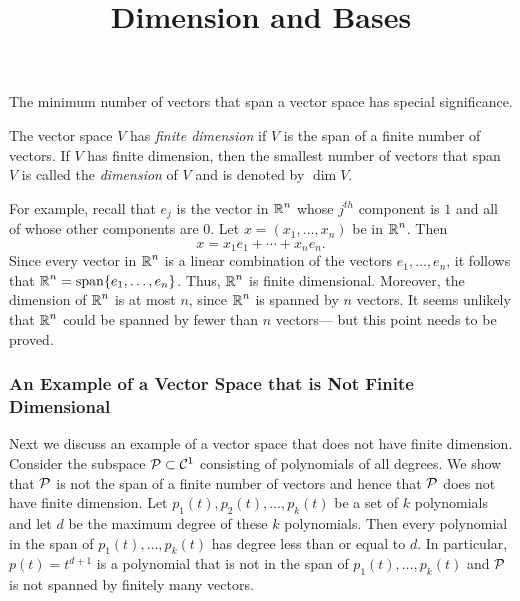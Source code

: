\documentclass{ximera}
\title{Dimension and Bases}
\begin{document}
\begin{abstract}
\end{abstract}
\maketitle

 \label{S:5.5}

The minimum number of vectors that span a vector space has special
significance.

\begin{definition}
The vector space $V$ has {\em finite dimension\/} if $V$ is the
span of a finite number of vectors.  If $V$ has finite dimension, then the
smallest number of vectors that span $V$ is called the {\em dimension\/} of
$V$ and is denoted by $\dim V$.
\end{definition}  

For example, recall that $e_j$ is the vector in $\mbox{$\Bbb{R}$}^n$ whose $j^{th}$
component is $1$ and all of whose other components are $0$.
Let $x=(x_1,\ldots,x_n)$ be in $\mbox{$\Bbb{R}$}^n$. Then
\begin{equation}  \label{e:spanrn}
x =  x_1e_1 + \cdots + x_ne_n.
\end{equation}
Since every vector in $\mbox{$\Bbb{R}$}^n$ is a linear combination of the
vectors $e_1,\ldots,e_n$, it follows that
$\mbox{$\Bbb{R}$}^n={\rm span}\{e_1,\ldots,e_n\}$.  Thus, $\mbox{$\Bbb{R}$}^n$ is finite
dimensional.  Moreover, the dimension of $\mbox{$\Bbb{R}$}^n$ is at most $n$,
since $\mbox{$\Bbb{R}$}^n$ is spanned by $n$ vectors. It seems unlikely that
$\mbox{$\Bbb{R}$}^n$ could be spanned by fewer than $n$ vectors--- but this
point needs to be proved.

\subsubsection*{An Example of a Vector Space that is Not Finite Dimensional}

Next we discuss an example of a vector space that does not have finite 
dimension.  Consider the subspace ${\cal P}\subset{\cal C}^1$ consisting of 
polynomials  of all degrees.  We show that 
${\cal P}$ is not the span of a finite number of vectors and hence that 
${\cal P}$ does not have finite dimension.  Let $p_1(t),p_2(t),\ldots,p_k(t)$ 
be a set of $k$ polynomials and let $d$ be the maximum degree of these $k$ 
polynomials.  Then every polynomial in the span of $p_1(t),\ldots,p_k(t)$ has 
degree less than or equal to $d$.  In particular, $p(t)=t^{d+1}$ is a 
polynomial that is not in the span of $p_1(t),\ldots,p_k(t)$ and ${\cal P}$ 
is not spanned by finitely many vectors.
\end{document}
